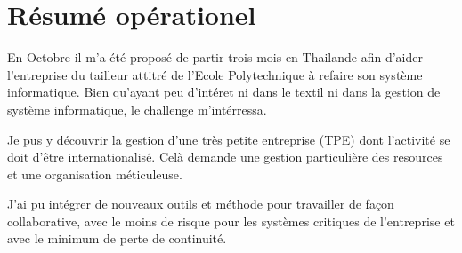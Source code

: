 \chapter*{Résumé opérationel}
En Octobre il m'a été proposé de partir trois mois en Thailande afin d'aider l'entreprise du tailleur attitré de l'Ecole Polytechnique à refaire son système informatique. Bien qu'ayant peu d'intéret ni dans le textil ni dans la gestion de système informatique, le challenge m'intérressa.


Je pus y découvrir la gestion d'une très petite entreprise (TPE) dont l'activité se doit d'être internationalisé. Celà demande une gestion particulière des resources et une organisation méticuleuse.


J'ai pu intégrer de nouveaux outils et méthode pour travailler de façon collaborative, avec le moins de risque pour les systèmes critiques de l'entreprise et avec le minimum de perte de continuité.
